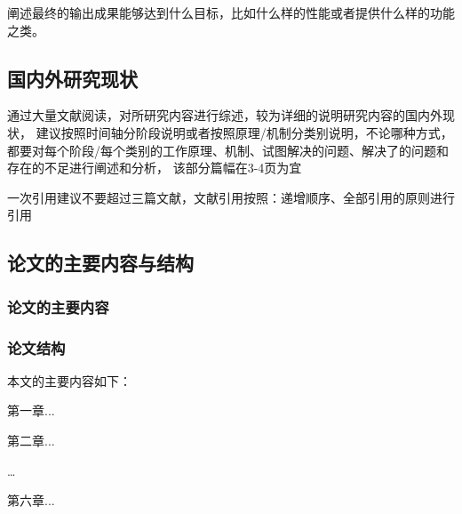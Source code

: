 阐述最终的输出成果能够达到什么目标，比如什么样的性能或者提供什么样的功能之类。

\subsection{国内外研究现状}
通过大量文献阅读，对所研究内容进行综述，较为详细的说明研究内容的国内外现状，
建议按照时间轴分阶段说明或者按照原理/机制分类别说明，不论哪种方式，
都要对每个阶段/每个类别的工作原理、机制、试图解决的问题、解决了的问题和存在的不足进行阐述和分析，
该部分篇幅在3-4页为宜

一次引用建议不要超过三篇文献，文献引用按照：递增顺序、全部引用的原则进行引用

\subsection{论文的主要内容与结构}
\subsubsection{论文的主要内容}

\subsubsection{论文结构}
本文的主要内容如下：

第一章...

第二章...

\dots

第六章...






